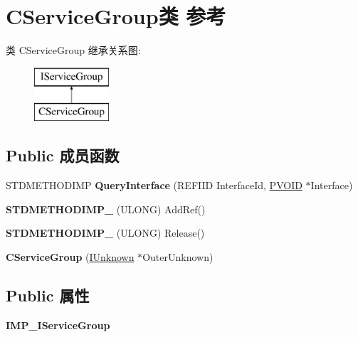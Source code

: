\hypertarget{class_c_service_group}{}\section{C\+Service\+Group类 参考}
\label{class_c_service_group}
类 C\+Service\+Group 继承关系图\+:\begin{figure}[H]
\begin{center}
\leavevmode
\includegraphics[height=2.000000cm]{class_c_service_group}
\end{center}
\end{figure}
\subsection*{Public 成员函数}
\begin{DoxyCompactItemize}
\item 
\mbox{\label{class_c_service_group_a9ae2752b1df35b475f6ffc306b6c6308}} 
S\+T\+D\+M\+E\+T\+H\+O\+D\+I\+MP {\bfseries Query\+Interface} (R\+E\+F\+I\+ID Interface\+Id, \hyperlink{interfacevoid}{P\+V\+O\+ID} $\ast$Interface)
\item 
\mbox{\label{class_c_service_group_aa0a44384105abbbbd3579858ed23e9d3}} 
{\bfseries S\+T\+D\+M\+E\+T\+H\+O\+D\+I\+M\+P\+\_\+} (U\+L\+O\+NG) Add\+Ref()
\item 
\mbox{\label{class_c_service_group_a7121f71a31598fbd51c84c63cabc0480}} 
{\bfseries S\+T\+D\+M\+E\+T\+H\+O\+D\+I\+M\+P\+\_\+} (U\+L\+O\+NG) Release()
\item 
\mbox{\label{class_c_service_group_afbc46bde608d65d2c0564c405eaaf7c6}} 
{\bfseries C\+Service\+Group} (\hyperlink{interface_i_unknown}{I\+Unknown} $\ast$Outer\+Unknown)
\end{DoxyCompactItemize}
\subsection*{Public 属性}
\begin{DoxyCompactItemize}
\item 
\mbox{\label{class_c_service_group_ad914f696a328156f47668c7b23e59ec1}} 
{\bfseries I\+M\+P\+\_\+\+I\+Service\+Group}
\end{DoxyCompactItemize}
